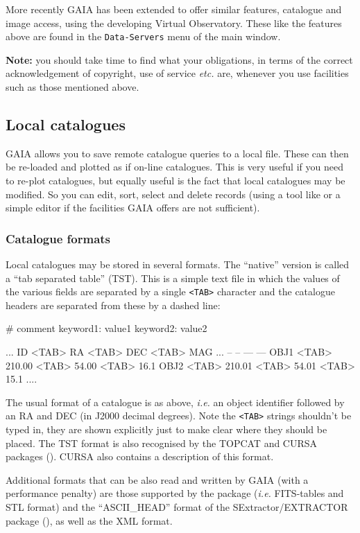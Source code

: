 \documentclass[twoside,11pt,nolof]{starlink}
\providecommand{\mytt}[1]{{\texttt{#1}}}
\begin{document}
More recently GAIA has been extended to offer similar features,
catalogue and image access, using the developing Virtual
Observatory. These like the features above are found in the
\mytt{Data-Servers} menu of the main window.




\textbf{Note:} you should take time to find what your obligations, in
terms of the correct acknowledgement of copyright, use of service
\emph{etc.} are, whenever you use facilities such as those mentioned
above.

\subsection{Local catalogues}
GAIA allows you to save remote catalogue queries to a local file. These
can then be re-loaded and plotted as if on-line catalogues. This is very
useful if you need to re-plot catalogues, but equally useful is the fact
that local catalogues may be modified. So you can edit, sort, select and
delete records (using a tool like
 or a
simple editor if the facilities GAIA offers are not sufficient).

\subsubsection{Catalogue formats}
Local catalogues may be stored in several formats. The ``native''
version is called a ``tab separated table'' (TST). This is a simple
text file in which the values of the various fields are separated by a
single \mytt{<TAB>} character and the catalogue headers are separated
from these by a dashed line:
\begin{terminalv}
#  comment
keyword1: value1
keyword2: value2

...
ID   <TAB>   RA     <TAB>   DEC   <TAB>  MAG     ...
--           --             ---          ---
OBJ1 <TAB>   210.00 <TAB>   54.00 <TAB>  16.1
OBJ2 <TAB>   210.01 <TAB>   54.01 <TAB>  15.1
....
\end{terminalv}
The usual format of a catalogue is as above, \textit{i.e.} an object identifier
followed by an RA and DEC (in J2000 decimal degrees). Note the
\mytt{<TAB>} strings shouldn't be typed in, they are shown explicitly
just to make clear where they should be placed. The TST format is also
recognised by the TOPCAT and CURSA packages ().
CURSA also contains a description of this format.

Additional formats that can be also read and written by GAIA (with a
performance penalty) are those supported by the 
package (\textit{i.e.} FITS-tables and STL format) and the
``ASCII\_HEAD'' format of the SExtractor/EXTRACTOR package
(), as well as the XML
format.
\end{document}

